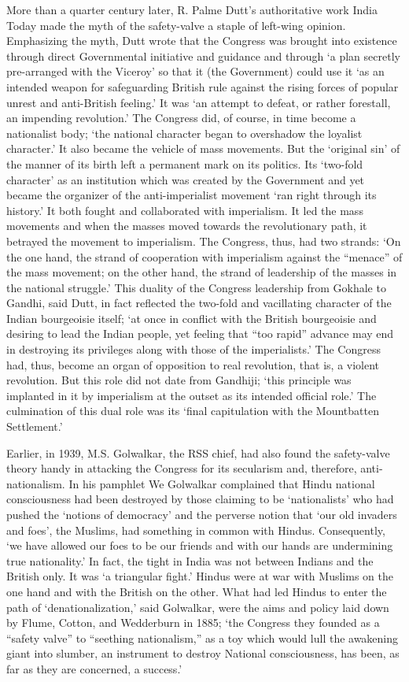 More than a quarter century later, R. Palme Dutt's authoritative work India Today made the myth of the safety-valve a staple of left-wing opinion. Emphasizing the myth, Dutt wrote that the Congress was brought into existence through direct Governmental initiative and guidance and through `a plan secretly pre-arranged with the Viceroy' so that it (the Government) could use it `as an intended weapon for safeguarding British rule against the rising forces of popular unrest and anti-British feeling.' It was `an attempt to defeat, or rather forestall, an impending revolution.' The Congress did, of course, in time become a nationalist body; `the national character began to overshadow the loyalist character.' It also became the vehicle of mass movements. But the `original sin' of the manner of its birth left a permanent mark on its politics. Its `two-fold character' as an institution which was created by the Government and yet became the organizer of the anti-imperialist movement `ran right through its history.' It both fought and collaborated with imperialism. It led the mass movements and when the masses moved towards the revolutionary path, it betrayed the movement to imperialism. The Congress, thus, had two strands: `On the one hand, the strand of cooperation with imperialism against the ``menace'' of the mass movement; on the other hand, the strand of leadership of the masses in the national struggle.' This duality of the Congress leadership from Gokhale to Gandhi, said Dutt, in fact reflected the two-fold and vacillating character of the Indian bourgeoisie itself; `at once in conflict with the British bourgeoisie and desiring to lead the Indian people, yet feeling that ``too rapid'' advance may end in destroying its privileges along with those of the imperialists.' The Congress had, thus, become an organ of opposition to real revolution, that is, a violent revolution. But this role did not date from Gandhiji; `this principle was implanted in it by imperialism at the outset as its intended official role.' The culmination of this dual role was its `final capitulation with the Mountbatten Settlement.'

Earlier, in 1939, M.S. Golwalkar, the RSS chief, had also found the safety-valve theory handy in attacking the Congress for its secularism and, therefore, anti-nationalism. In his pamphlet We Golwalkar complained that Hindu national consciousness had been destroyed by those claiming to be `nationalists' who had pushed the `notions of democracy' and the perverse notion that `our old invaders and foes', the Muslims, had something in common with Hindus. Consequently, `we have allowed our foes to be our friends and with our hands are undermining true nationality.' In fact, the tight in India was not between Indians and the British only. It was `a triangular fight.' Hindus were at war with Muslims on the one hand and with the British on the other. What had led Hindus to enter the path of `denationalization,' said Golwalkar, were the aims and policy laid down by Flume, Cotton, and Wedderburn in 1885; `the Congress they founded as a ``safety valve'' to ``seething nationalism,'' as a toy which would lull the awakening giant into slumber, an instrument to destroy National consciousness, has been, as far as they are concerned, a success.'

